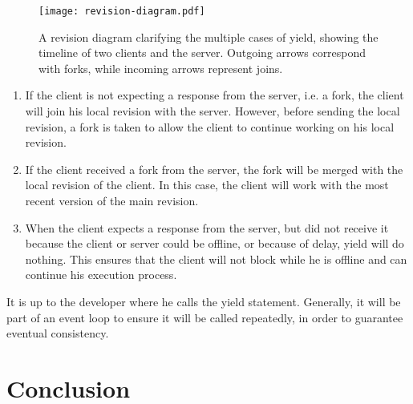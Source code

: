 \documentclass[a4paper,12pt]{report}
\begin{document}
\begin{figure}
    \vspace{-2,5cm}
    \small
    \centering
    \texttt{[image: revision-diagram.pdf]}
    \caption{A revision diagram clarifying the multiple cases of yield, showing the timeline of two clients and the server. Outgoing arrows correspond with forks, while incoming arrows represent joins.}
    \label{fig:revisiondiagram}
\end{figure}

\begin{enumerate}
    \item If the client is not expecting a response from the server, i.e. a fork, the client will join his local revision with the server. However, before sending the local revision, a fork is taken to allow the client to continue working on his local revision.
    \item If the client received a fork from the server, the fork will be merged with the local revision of the client. In this case, the client will work with the most recent version of the main revision.
    \item When the client expects a response from the server, but did not receive it because the client or server could be offline, or because of delay, yield will do nothing. This ensures that the client will not block while he is offline and can continue his execution process.
\end{enumerate}

It is up to the developer where he calls the yield statement. Generally, it will be part of an event loop to ensure it will be called repeatedly, in order to guarantee eventual consistency.

\chapter{Conclusion}\label{cha:Conclusion} %
\end{document}
